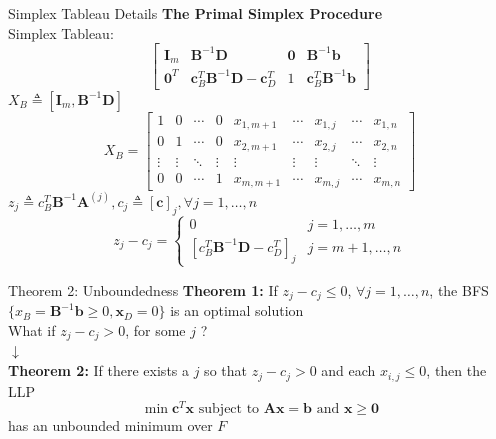 \documentclass[aspectratio=169,hyperref,UTF8,CJK]{beamer}
\begin{document}
\begin{frame}{Simplex Tableau Details}
\textbf{The Primal Simplex Procedure} \\
Simplex Tableau:
\[
\begin{bmatrix}
\mathbf{I}_m & \mathbf{B}^{-1}\mathbf{D} & \mathbf{0} & \mathbf{B}^{-1}\mathbf{b} \\
\mathbf{0}^T & \mathbf{c}_B^T\mathbf{B}^{-1}\mathbf{D} - \mathbf{c}_D^T & 1 & \mathbf{c}_B^T\mathbf{B}^{-1}\mathbf{b}
\end{bmatrix}
\]
\(X_B \triangleq [\mathbf{I}_m, \mathbf{B}^{-1}\mathbf{D}]\)
\[
X_B = \begin{bmatrix} 1 & 0 & \cdots & 0 & x_{1,m+1} & \cdots & x_{1,j} & \cdots & x_{1,n} \\ 0 & 1 & \cdots & 0 & x_{2,m+1} & \cdots & x_{2,j} & \cdots & x_{2,n} \\ \vdots & \vdots & \ddots & \vdots & \vdots & \vdots & \vdots & \ddots & \vdots \\ 0 & 0 & \cdots & 1 & x_{m,m+1} & \cdots & x_{m,j} & \cdots & x_{m,n} \end{bmatrix}
\]
\(z_j \triangleq c_B^T \mathbf{B}^{-1} \mathbf{A}^{(j)}, c_j \triangleq [\mathbf{c}]_j, \forall j = 1, \ldots, n\)
\[
z_j - c_j = \begin{cases} 0 & j = 1, \ldots, m \\ {[c_B^T \mathbf{B}^{-1} \mathbf{D} - c_D^T]_j} & j = m+1, \ldots, n \end{cases}
\]
\end{frame}

\begin{frame}{Theorem 2: Unboundedness}
\textbf{Theorem 1:} If \(z_j - c_j \leq 0\), \(\forall j = 1, \ldots , n\), the BFS \(\{x_B = \mathbf{B}^{-1} \mathbf{b} \geq 0, \mathbf{x}_D = 0\}\) is an optimal solution \\
What if \(z_j - c_j > 0\), for some \(j\) ? \\
\(\downarrow\) \\
\textbf{Theorem 2:} If there exists a \(j\) so that \(z_j - c_j > 0\) and each \(x_{i,j} \leq 0\), then the LLP
\[
\min \mathbf{c}^T \mathbf{x} \text{ subject to } \mathbf{A} \mathbf{x} = \mathbf{b} \text{ and } \mathbf{x} \geq \mathbf{0}
\]
has an unbounded minimum over \(F\)
\end{frame}
\end{document}
